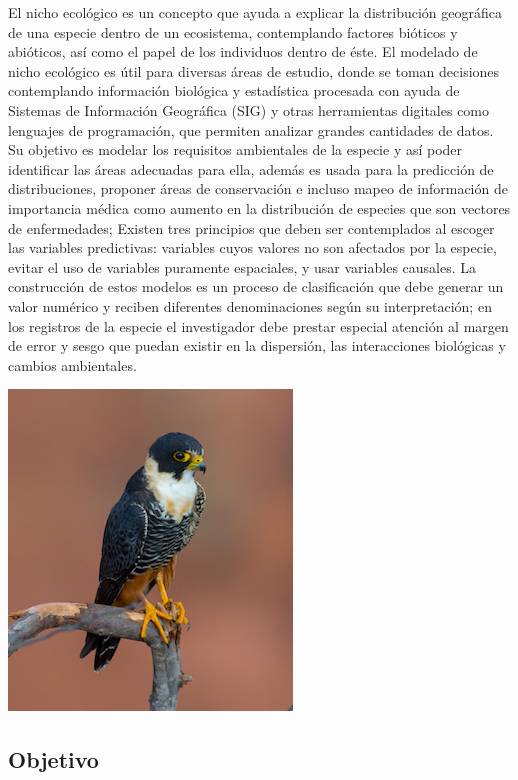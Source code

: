 \documentclass[
]{article}
\begin{document}
El nicho ecológico es un concepto que ayuda a explicar la distribución
geográfica de una especie dentro de un ecosistema, contemplando factores
bióticos y abióticos, así como el papel de los individuos dentro de
éste. El modelado de nicho ecológico es útil para diversas áreas de
estudio, donde se toman decisiones contemplando información biológica y
estadística procesada con ayuda de Sistemas de Información Geográfica
(SIG) y otras herramientas digitales como lenguajes de programación, que
permiten analizar grandes cantidades de datos. Su objetivo es modelar
los requisitos ambientales de la especie y así poder identificar las
áreas adecuadas para ella, además es usada para la predicción de
distribuciones, proponer áreas de conservación e incluso mapeo de
información de importancia médica como aumento en la distribución de
especies que son vectores de enfermedades; Existen tres principios que
deben ser contemplados al escoger las variables predictivas: variables
cuyos valores no son afectados por la especie, evitar el uso de
variables puramente espaciales, y usar variables causales. La
construcción de estos modelos es un proceso de clasificación que debe
generar un valor numérico y reciben diferentes denominaciones según su
interpretación; en los registros de la especie el investigador debe
prestar especial atención al margen de error y sesgo que puedan existir
en la dispersión, las interacciones biológicas y cambios ambientales.

\includegraphics{./FALCO.jpeg}

\hypertarget{objetivo}{%
\subsection{Objetivo}\label{objetivo}}
\end{document}
